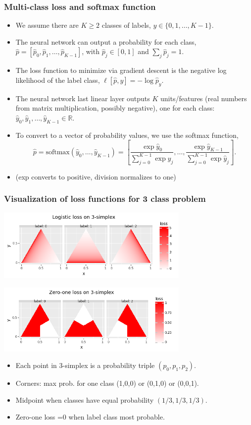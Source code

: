 \documentclass{beamer}
\begin{document}
\begin{frame}
  \frametitle{Multi-class loss and softmax function}

  \begin{itemize}
  \item We assume there are $K\geq 2$ classes of labels,
    $y\in\{0,1, \dots, K-1\}$.
  \item The neural network can output a probability for each
    class, $\hat p = [\hat p_0,\hat p_1,\dots,\hat p_{K-1}]$, with
    $\hat p_j\in[0,1]$ and $\sum_j \hat p_j=1$.
  \item The loss function to minimize via gradient descent is the
    negative log likelihood of the label class, $\ell[\hat p,y] = -\log \hat p_y.$
  \item The neural network last linear layer outputs $K$
    units/features (real numbers from matrix multiplication, possibly
    negative), one for each class:
    $\hat y_0,\hat y_1,\dots, \hat y_{K-1}\in\mathbb R$.
  \item To convert to a vector of probability values, we use the
    softmax function, 
$$ \hat p=\text{softmax}(\hat y_0, \dots, \hat y_{K-1}) = 
\left[ \frac{\exp\hat y_0}{\sum_{j=0}^{K-1} \exp\hat y_j}, \dots,
\frac{\exp\hat y_{K-1}}{\sum_{j=0}^{K-1} \exp\hat y_j}\right].
$$
\item (exp converts to positive, division normalizes to one)
  \end{itemize}
\end{frame}

\begin{frame}
  \frametitle{Visualization of loss functions for 3 class problem}
  
  \includegraphics[width=0.7\textwidth]{2022-02-15-simplex-multi-logistic}

  \includegraphics[width=0.7\textwidth]{2022-02-15-simplex-multi-zero-one}

  \begin{itemize}
  \item Each point in 3-simplex is a probability triple
    $(p_0,p_1,p_2)$.
  \item Corners: max prob. for one class (1,0,0)
    or (0,1,0) or (0,0,1).
  \item Midpoint when classes have equal probability
    $(1/3, 1/3, 1/3)$.
  \item Zero-one loss =0 when label class most probable.
  \end{itemize}
\end{frame}
\end{document}

